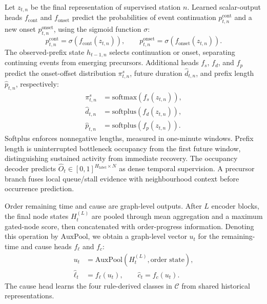 \documentclass[a4paper,fleqn]{cas-dc}
\begin{document}
Let $z_{t,n}$ be the final representation of supervised station $n$. Learned scalar-output heads $f_{\mathrm{cont}}$ and $f_{\mathrm{onset}}$ predict the probabilities of event continuation $p^{\mathrm{cont}}_{t,n}$ and a new onset $p^{\mathrm{onset}}_{t,n}$, using the sigmoid function $\sigma$:
\begin{equation}
p^{\mathrm{cont}}_{t,n}=\sigma(f_{\mathrm{cont}}(z_{t,n})),
\qquad
p^{\mathrm{onset}}_{t,n}=\sigma(f_{\mathrm{onset}}(z_{t,n})).
\end{equation}
The observed-prefix state $h_{t-1,n}$ selects continuation or onset, separating continuing events from emerging precursors. Additional heads $f_s$, $f_d$, and $f_p$ predict the onset-offset distribution $\pi^s_{t,n}$, future duration $\hat d_{t,n}$, and prefix length $\hat p_{t,n}$, respectively:
\begin{equation}
\begin{aligned}
\pi^s_{t,n}&=\mathrm{softmax}(f_s(z_{t,n})),\\
\hat d_{t,n}&=\mathrm{softplus}(f_d(z_{t,n})),\\
\hat p_{t,n}&=\mathrm{softplus}(f_p(z_{t,n})).
\end{aligned}
\end{equation}
Softplus enforces nonnegative lengths, measured in one-minute windows. Prefix length is uninterrupted bottleneck occupancy from the first future window, distinguishing sustained activity from immediate recovery.
The occupancy decoder predicts $\hat O_t\in[0,1]^{H_{\mathrm{label}}\times N}$ as dense temporal supervision. A precursor branch fuses local queue/stall evidence with neighbourhood context before occurrence prediction.

Order remaining time and cause are graph-level outputs. After $L$ encoder blocks, the final node states $H_t^{(L)}$ are pooled through mean aggregation and a maximum gated-node score, then concatenated with order-progress information. Denoting this operation by $\mathrm{AuxPool}$, we obtain a graph-level vector $u_t$ for the remaining-time and cause heads $f_\ell$ and $f_c$:
\begin{equation}
\begin{aligned}
u_t&=\mathrm{AuxPool}(H_t^{(L)},\text{order state}),\\
\hat\ell_t&=f_\ell(u_t),\qquad \hat c_t=f_c(u_t).
\end{aligned}
\end{equation}
The cause head learns the four rule-derived classes in $\mathcal{C}$ from shared historical representations.
\end{document}
